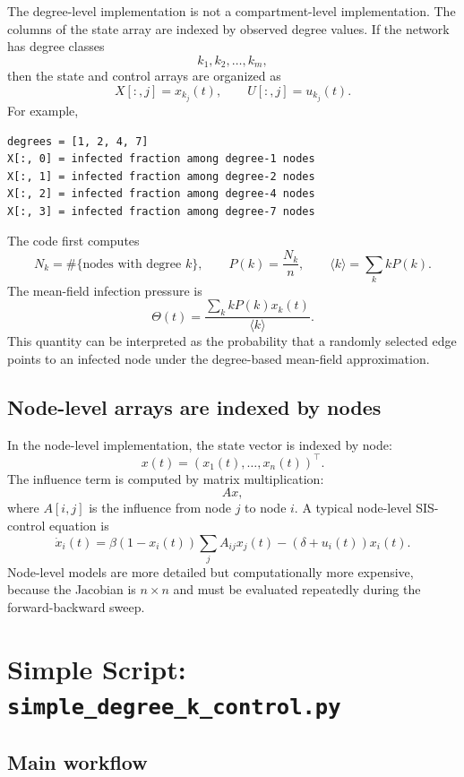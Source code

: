 \documentclass[11pt,a4paper]{article}
\begin{document}
The degree-level implementation is not a compartment-level implementation. The columns of the state array are indexed by observed degree values. If the network has degree classes
\[
  k_1,k_2,\ldots,k_m,
\]
then the state and control arrays are organized as
\[
  X[:,j] = x_{k_j}(t),
  \qquad
  U[:,j] = u_{k_j}(t).
\]
For example,

\begin{lstlisting}[style=text]
degrees = [1, 2, 4, 7]
X[:, 0] = infected fraction among degree-1 nodes
X[:, 1] = infected fraction among degree-2 nodes
X[:, 2] = infected fraction among degree-4 nodes
X[:, 3] = infected fraction among degree-7 nodes
\end{lstlisting}

The code first computes
\[
  N_k = \#\{\text{nodes with degree }k\},
  \qquad
  P(k)=\frac{N_k}{n},
  \qquad
  \langle k\rangle = \sum_k kP(k).
\]
The mean-field infection pressure is
\[
  \Theta(t)=\frac{\sum_k kP(k)x_k(t)}{\langle k\rangle}.
\]
This quantity can be interpreted as the probability that a randomly selected edge points to an infected node under the degree-based mean-field approximation.

\subsection{Node-level arrays are indexed by nodes}

In the node-level implementation, the state vector is indexed by node:
\[
  x(t)=(x_1(t),\ldots,x_n(t))^\top.
\]
The influence term is computed by matrix multiplication:
\[
  A x,
\]
where \(A[i,j]\) is the influence from node \(j\) to node \(i\). A typical node-level SIS-control equation is
\[
  \dot{x}_i(t)
  =\beta(1-x_i(t))\sum_j A_{ij}x_j(t)
  -(\delta+u_i(t))x_i(t).
\]
Node-level models are more detailed but computationally more expensive, because the Jacobian is \(n\times n\) and must be evaluated repeatedly during the forward-backward sweep.

\section[Simple Script: simple\_degree\_k\_control.py]{Simple Script: \texttt{simple\_degree\_k\_control.py}}

\subsection{Main workflow}
\end{document}
